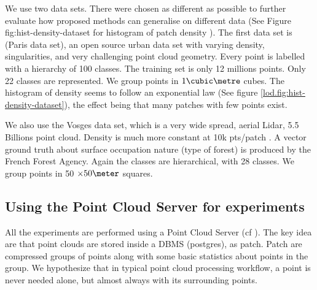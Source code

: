  		We use two data sets. There were chosen as different as possible to further evaluate how proposed methods can generalise on different data (See Figure fig:hist-density-dataset for histogram of patch density ). 
 		The first data set is \cite{IQmulus2014} (Paris data set), an open source urban data set with varying density, singularities, and very challenging point cloud geometry. 
 		Every point is labelled with a hierarchy of 100 classes.
 		The training set is only 12 millions points.
 		Only 22 classes are represented. We group points in $1 \cubic \metre$ cubes.
 		The histogram of density seems to follow an exponential law (See figure \ref{lod.fig:hist-density-dataset}), the effect being that many patches with few points exist. 
 		
 		We also use the Vosges data set, which is a very wide spread, aerial Lidar, 5.5 Billions point cloud. 
 		Density is much more constant at 10k pts/patch .
 		A vector ground truth about surface occupation nature (type of forest) is produced by the French Forest Agency. Again the classes are hierarchical, with 28 classes.
 		We group points in 50 $\times 50 \meter$ squares.
 		

	\subsection{Using the Point Cloud Server for experiments}
		All the experiments are performed using a Point Cloud Server (cf \cite{Cura2014}).
		The key idea are that point clouds are stored inside a DBMS (postgres), as patch. Patch are compressed groups of points along with some basic statistics about points in the group.
		We hypothesize that in typical point cloud processing workflow, a point is never needed alone, but almost always with its surrounding points.
	
